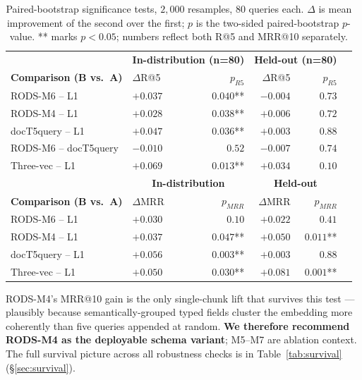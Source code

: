 \documentclass[11pt]{article}
\begin{document}
\begin{table}[t]
\centering
\caption{Paired-bootstrap significance tests, $2{,}000$ resamples,
  $80$ queries each. $\Delta$ is mean improvement of the second over
  the first; $p$ is the two-sided paired-bootstrap $p$-value. ** marks
  $p{<}0.05$; numbers reflect both R@5 and MRR@10 separately.}
\label{tab:significance}
\small
\begin{tabular}{llrrrr}
\toprule
& \multicolumn{2}{c}{\textbf{In-distribution (n=80)}} & \multicolumn{2}{c}{\textbf{Held-out (n=80)}} \\
\textbf{Comparison (B vs.\ A)} & $\Delta$R@5 & $p_{R5}$ & $\Delta$R@5 & $p_{R5}$ \\
\midrule
RODS-M6 -- L1            & $+0.037$ & $0.040$** & $-0.004$ & $0.73$ \\
RODS-M4 -- L1            & $+0.028$ & $0.038$** & $+0.006$ & $0.72$ \\
docT5query -- L1         & $+0.047$ & $0.036$** & $+0.003$ & $0.88$ \\
RODS-M6 -- docT5query    & $-0.010$ & $0.52$    & $-0.007$ & $0.74$ \\
Three-vec -- L1          & $+0.069$ & $0.013$** & $+0.034$ & $0.10$ \\
\midrule
& \multicolumn{2}{c}{\textbf{In-distribution}} & \multicolumn{2}{c}{\textbf{Held-out}} \\
\textbf{Comparison (B vs.\ A)} & $\Delta$MRR & $p_{MRR}$ & $\Delta$MRR & $p_{MRR}$ \\
\midrule
RODS-M6 -- L1            & $+0.030$ & $0.10$    & $+0.022$ & $0.41$ \\
RODS-M4 -- L1            & $+0.037$ & $0.047$** & $+0.050$ & $0.011$** \\
docT5query -- L1         & $+0.056$ & $0.003$** & $+0.003$ & $0.88$ \\
Three-vec -- L1          & $+0.050$ & $0.030$** & $+0.081$ & $0.001$** \\
\bottomrule
\end{tabular}
\end{table}

RODS-M4's MRR@10 gain is the only single-chunk lift that survives
this test --- plausibly because semantically-grouped typed fields
cluster the embedding more coherently than five queries appended at
random. \textbf{We therefore recommend RODS-M4 as the deployable
schema variant}; M5--M7 are ablation context. The full survival
picture across all robustness checks is in
Table~\ref{tab:survival} (\S\ref{sec:survival}).
\end{document}
